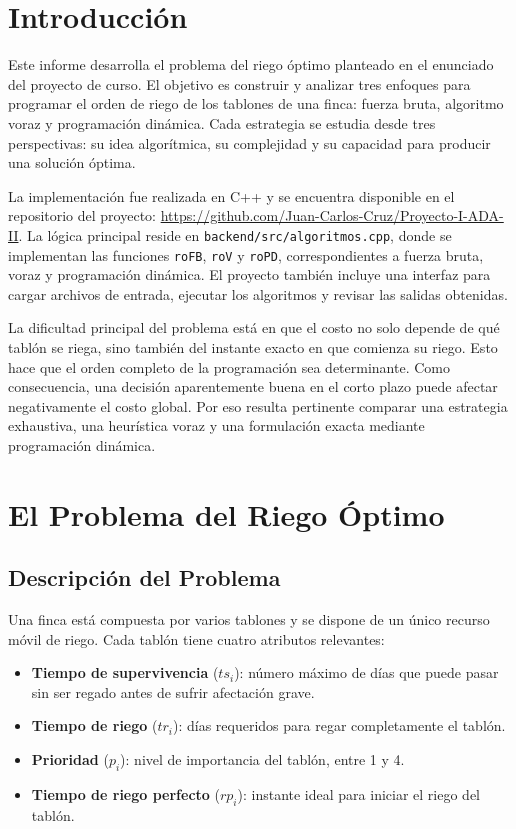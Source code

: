 \documentclass[12pt,a4paper]{article}
\begin{document}
\clearpage
\hypersetup{pageanchor=true}
\tableofcontents
\newpage

\section{Introducci\'on}

Este informe desarrolla el problema del riego \'optimo planteado en el enunciado del proyecto de curso. El objetivo es construir y analizar tres enfoques para programar el orden de riego de los tablones de una finca: fuerza bruta, algoritmo voraz y programaci\'on din\'amica. Cada estrategia se estudia desde tres perspectivas: su idea algor\'itmica, su complejidad y su capacidad para producir una soluci\'on \'optima.

La implementaci\'on fue realizada en C++ y se encuentra disponible en el repositorio del proyecto: \url{https://github.com/Juan-Carlos-Cruz/Proyecto-I-ADA-II}. La l\'ogica principal reside en \texttt{backend/src/algoritmos.cpp}, donde se implementan las funciones \texttt{roFB}, \texttt{roV} y \texttt{roPD}, correspondientes a fuerza bruta, voraz y programaci\'on din\'amica. El proyecto tambi\'en incluye una interfaz para cargar archivos de entrada, ejecutar los algoritmos y revisar las salidas obtenidas.

La dificultad principal del problema est\'a en que el costo no solo depende de qu\'e tabl\'on se riega, sino tambi\'en del instante exacto en que comienza su riego. Esto hace que el orden completo de la programaci\'on sea determinante. Como consecuencia, una decisi\'on aparentemente buena en el corto plazo puede afectar negativamente el costo global. Por eso resulta pertinente comparar una estrategia exhaustiva, una heur\'istica voraz y una formulaci\'on exacta mediante programaci\'on din\'amica.
\section{El Problema del Riego \'Optimo}

\subsection{Descripci\'on del Problema}

Una finca est\'a compuesta por varios tablones y se dispone de un \'unico recurso m\'ovil de riego. Cada tabl\'on tiene cuatro atributos relevantes:

\begin{itemize}
  \item \textbf{Tiempo de supervivencia} (\(ts_i\)): n\'umero m\'aximo de d\'ias que puede pasar sin ser regado antes de sufrir afectaci\'on grave.
  \item \textbf{Tiempo de riego} (\(tr_i\)): d\'ias requeridos para regar completamente el tabl\'on.
  \item \textbf{Prioridad} (\(p_i\)): nivel de importancia del tabl\'on, entre 1 y 4.
  \item \textbf{Tiempo de riego perfecto} (\(rp_i\)): instante ideal para iniciar el riego del tabl\'on.
\end{itemize}
\end{document}
